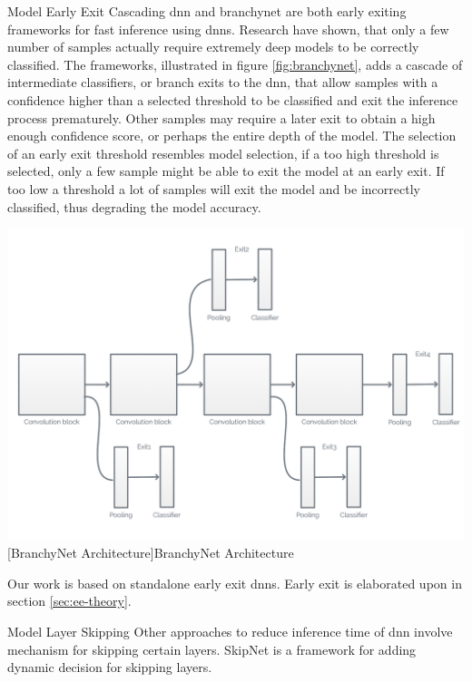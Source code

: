 \begin{enumdescript}
	\item[Model Early Exit] Cascading \gls{dnn} \cite{leroux_resource-constrained_2015} and \gls{branchynet} \cite{teerapittayanon_branchynet:_2016} are both early exiting frameworks for fast inference using \gls{dnn}s. Research have shown, that only a few number of samples actually require extremely deep models to be correctly classified. The frameworks, illustrated in figure \ref{fig:branchynet}, adds a cascade of intermediate classifiers, or branch exits to the \gls{dnn}, that allow samples with a confidence higher than a selected threshold to be classified and exit the inference process prematurely. Other samples may require a later exit to obtain a high enough confidence score, or perhaps the entire depth of the model. The selection of an early exit threshold resembles model selection, if a too high threshold is selected, only a few sample might be able to exit the model at an early exit. If too low a threshold a lot of samples will exit the model and be incorrectly classified, thus degrading the model accuracy. 

	\begin{minipage}[t]{\linewidth}    
		\centering                          
		\includegraphics[width=.8\linewidth]{figures/models/branchy}
		[BranchyNet Architecture]{BranchyNet Architecture}
		\label{fig:branchynet}
	\end{minipage}

	Our work is based on standalone early exit \gls{dnn}s. Early exit is elaborated upon in section \ref{sec:ee-theory}.
	
	\item[Model Layer Skipping] Other approaches to reduce inference time of \gls{dnn} involve mechanism for skipping certain layers. SkipNet \cite{wang_skipnet:_2017} is a framework for adding dynamic decision for skipping layers. 
	

\end{enumdescript}
